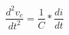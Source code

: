 \documentclass[preview]{standalone}
\begin{document}
\begin{center}
\[\frac{d^2v_c}{dt^2} = \frac{1}{C} * \frac{di}{dt}\]
\end{center}
\end{document}
